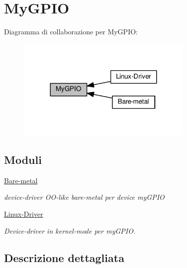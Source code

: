 \hypertarget{group__my_g_p_i_o}{}\section{My\+G\+P\+IO}
\label{group__my_g_p_i_o}
Diagramma di collaborazione per My\+G\+P\+IO\+:\nopagebreak
\begin{figure}[H]
\begin{center}
\leavevmode
\includegraphics[width=240pt]{group__my_g_p_i_o}
\end{center}
\end{figure}
\subsection*{Moduli}
\begin{DoxyCompactItemize}
\item 
\hyperlink{group__bare-metal}{Bare-\/metal}
\begin{DoxyCompactList}\small\item\em device-\/driver O\+O-\/like bare-\/metal per device my\+G\+P\+IO \end{DoxyCompactList}\item 
\hyperlink{group___linux-_driver}{Linux-\/\+Driver}
\begin{DoxyCompactList}\small\item\em Device-\/driver in kernel-\/mode per my\+G\+P\+IO. \end{DoxyCompactList}\end{DoxyCompactItemize}


\subsection{Descrizione dettagliata}
